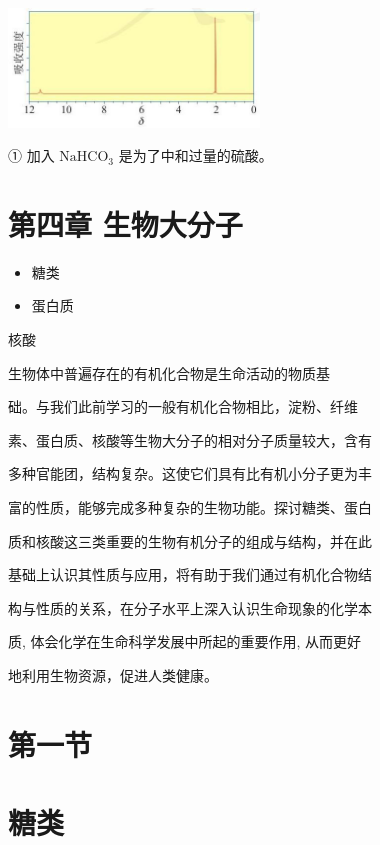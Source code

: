 \documentclass[10pt]{article}
\begin{document}
\begin{center}
\includegraphics[max width=0.5\textwidth]{images/0190efc5-b58a-7c43-bfb0-e0a030df9cfd_105_211923.jpg}
\end{center}

① 加入 \({\mathrm{{NaHCO}}}_{3}\) 是为了中和过量的硫酸。

\section*{第四章 生物大分子}

\begin{itemize}
\item 糖类
\end{itemize}

\begin{itemize}
\item 蛋白质
\end{itemize}

核酸

生物体中普遍存在的有机化合物是生命活动的物质基

础。与我们此前学习的一般有机化合物相比，淀粉、纤维

素、蛋白质、核酸等生物大分子的相对分子质量较大，含有

多种官能团，结构复杂。这使它们具有比有机小分子更为丰

富的性质，能够完成多种复杂的生物功能。探讨糖类、蛋白

质和核酸这三类重要的生物有机分子的组成与结构，并在此

基础上认识其性质与应用，将有助于我们通过有机化合物结

构与性质的关系，在分子水平上深入认识生命现象的化学本

质, 体会化学在生命科学发展中所起的重要作用, 从而更好

地利用生物资源，促进人类健康。

\section*{第一节}

\section*{糖类}
\end{document}
